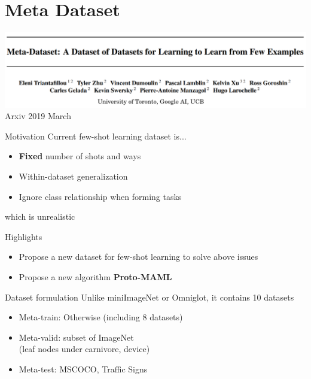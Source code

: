 \documentclass{beamer}
\begin{document}
\section{Meta Dataset}

\begin{frame}
  \includegraphics[width=\textwidth]{fig/MD.png}
  \center Arxiv 2019 March
\end{frame}

\begin{frame}{Motivation}
  Current few-shot learning dataset is...
  \begin{itemize}
    \item \textbf{Fixed} number of shots and ways
    \item Within-dataset generalization
    \item Ignore class relationship when forming tasks
  \end{itemize}

  \pause
  \center which is unrealistic
\end{frame}

\begin{frame}{Highlights}
  \begin{itemize}
    \item Propose a new dataset for few-shot learning to solve above issues
    \item Propose a new algorithm \textbf{Proto-MAML}
  \end{itemize}
\end{frame}

\begin{frame}{Dataset formulation}
  Unlike miniImageNet or Omniglot, it contains 10 datasets
  \begin{itemize}
    \item Meta-train: Otherwise (including 8 datasets)
    \item Meta-valid: subset of ImageNet \\
      (leaf nodes under carnivore, device)
    \item Meta-test: MSCOCO, Traffic Signs
  \end{itemize}
\end{frame}
\end{document}
